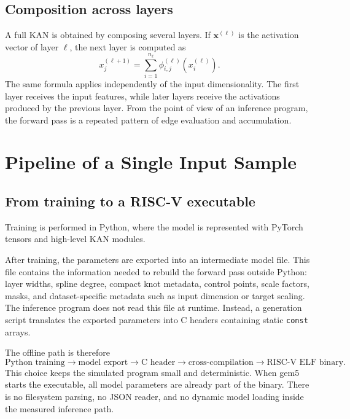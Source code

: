 \documentclass[11pt,a4paper]{article}
\begin{document}
\subsection{Composition across layers}

A full KAN is obtained by composing several layers.
If $\bm{x}^{(\ell)}$ is the activation vector of layer $\ell$, the next layer is computed as
\begin{equation}
    x^{(\ell+1)}_j
    =
    \sum_{i=1}^{n_{\ell}}
    \phi^{(\ell)}_{i,j}
    \left(
        x^{(\ell)}_i
    \right).
\end{equation}
The same formula applies independently of the input dimensionality.
The first layer receives the input features, while later layers receive the activations produced by the previous layer.
From the point of view of an inference program, the forward pass is a repeated pattern of edge evaluation and accumulation.

\section{Pipeline of a Single Input Sample}
\label{sec:single_data_pipeline}

\subsection{From training to a RISC-V executable}

Training is performed in Python, where the model is represented with PyTorch tensors and high-level KAN modules.

After training, the parameters are exported into an intermediate model file.
This file contains the information needed to rebuild the forward pass outside Python: layer widths, spline degree, compact knot metadata, control points, scale factors, masks, and dataset-specific metadata such as input dimension or target scaling.
The inference program does not read this file at runtime.
Instead, a generation script translates the exported parameters into C headers containing static \texttt{const} arrays.

The offline path is therefore
\begin{equation}
\text{Python training}
\rightarrow
\text{model export}
\rightarrow
\text{C header}
\rightarrow
\text{cross-compilation}
\rightarrow
\text{RISC-V ELF binary}.
\end{equation}
This choice keeps the simulated program small and deterministic.
When gem5 starts the executable, all model parameters are already part of the binary.
There is no filesystem parsing, no JSON reader, and no dynamic model loading inside the measured inference path.
\end{document}
